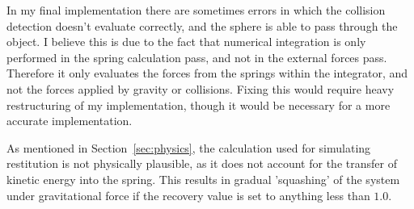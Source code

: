 \documentclass[]{acmsiggraph}
\begin{document}
In my final implementation there are sometimes errors in which the collision detection doesn't evaluate correctly, and the sphere is able to pass through the object. I believe this is due to the fact that numerical integration is only performed in the spring calculation pass, and not in the external forces pass. Therefore it only evaluates the forces from the springs within the integrator, and not the forces applied by gravity or collisions. Fixing this would require heavy restructuring of my implementation, though it would be necessary for a more accurate implementation.

As mentioned in Section~\ref{sec:physics}, the calculation used for simulating restitution is not physically plausible, as it does not account for the transfer of kinetic energy into the spring. This results in gradual 'squashing' of the system under gravitational force if the recovery value is set to anything less than $1.0$.



\end{document}
